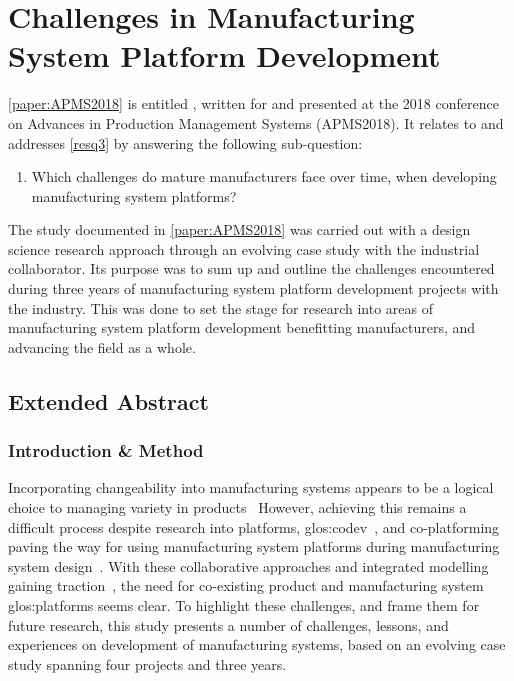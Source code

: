\section{Challenges in Manufacturing System Platform Development}\label{sec:challenges}
\cref{paper:APMS2018} is entitled , written for and presented at the 2018 conference on Advances in Production Management Systems (APMS2018).
It relates to and addresses \cref{resq3} by answering the following sub-question:
\begin{enumerate}[leftmargin=3em, label=RQ3.\arabic*]
    \item Which challenges do mature manufacturers face over time, when developing manufacturing system platforms?
\end{enumerate}
The study documented in \cref{paper:APMS2018} was carried out with a design science research approach through an evolving case study with the industrial collaborator.
Its purpose was to sum up and outline the challenges encountered during three years of manufacturing system platform development projects with the industry.
This was done to set the stage for research into areas of manufacturing system platform development benefitting manufacturers, and advancing the field as a whole.

\subsection{Extended Abstract}
\subsubsection*{Introduction \& Method}
Incorporating changeability into manufacturing systems appears to be a logical choice to managing variety in products~\parencite{HodaC,ElMaraghy2013629}
However, achieving this remains a difficult process despite research into platforms, \gls{glos:codev}~\parencite{MichaelisJohannesson}, and co-platforming~\parencite{ElMaraghy2015407} paving the way for using manufacturing system platforms during manufacturing system design~\parencite{BossenPbCd,Andersen2017179}.
With these collaborative approaches and integrated modelling gaining traction~\parencite{Michaelis2015203,LANDAHL201661}, the need for co-existing product and manufacturing system \gls{glos:platform}s seems clear.
To highlight these challenges, and frame them for future research, this study presents a number of challenges, lessons, and experiences on development of manufacturing systems, based on an evolving case study spanning four projects and three years.

